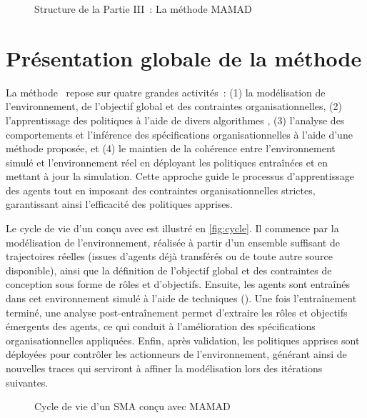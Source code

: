 \begin{figure}[h!]
  \centering
  \resizebox{0.7\linewidth}{!}{%
    
  }
  \caption{Structure de la Partie III~: La méthode MAMAD}
  \label{fig:organisation_manuscrit_partie_3}
\end{figure}



\clearpage
\thispagestyle{empty}
\null
\newpage

\chapter{Présentation globale de la méthode}
\label{chap:mamad_global}

La méthode ~\footnotemark[2] repose sur quatre grandes activités~: (1) la modélisation de l'environnement, de l'objectif global et des contraintes organisationnelles, (2) l'apprentissage des politiques à l'aide de divers algorithmes , (3) l'analyse des comportements et l'inférence des spécifications organisationnelles à l'aide d'une méthode proposée, et (4) le maintien de la cohérence entre l'environnement simulé et l'environnement réel en déployant les politiques entraînées et en mettant à jour la simulation. Cette approche guide le processus d'apprentissage des agents tout en imposant des contraintes organisationnelles strictes, garantissant ainsi l'efficacité des politiques apprises.

Le cycle de vie d'un  conçu avec  est illustré en \autoref{fig:cycle}. Il commence par la modélisation de l'environnement, réalisée à partir d'un ensemble suffisant de trajectoires réelles (issues d'agents déjà transférés ou de toute autre source disponible), ainsi que la définition de l'objectif global et des contraintes de conception sous forme de rôles et d'objectifs. Ensuite, les agents sont entraînés dans cet environnement simulé à l'aide de techniques  (). Une fois l'entraînement terminé, une analyse post-entraînement permet d'extraire les rôles et objectifs émergents des agents, ce qui conduit à l'amélioration des spécifications organisationnelles appliquées. Enfin, après validation, les politiques apprises sont déployées pour contrôler les actionneurs de l'environnement, générant ainsi de nouvelles traces qui serviront à affiner la modélisation lors des itérations suivantes.

\begin{figure}[h!]
  \centering
  
  \caption{Cycle de vie d'un SMA conçu avec MAMAD}
  \label{fig:cycle}
\end{figure}

